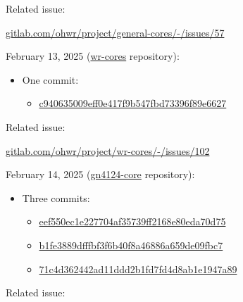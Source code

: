\noindent Related issue:

\vspace{5mm}

\href{https://gitlab.com/ohwr/project/general-cores/-/issues/57}{gitlab.com/ohwr/project/general-cores/-/issues/57}

\vspace{5mm}

\noindent February 13, 2025 (\href{https://gitlab.com/ohwr/project/wr-cores/}{wr-cores} repository):

\begin{itemize}
\item One commit:
    \begin{itemize}
    \item \href{https://gitlab.com/ohwr/project/wr-cores/-/commit/c940635009eff0e417f9b547fbd73396f89e6627}{c940635009eff0e417f9b547fbd73396f89e6627}
    \end{itemize}
\end{itemize}

\noindent Related issue:

\vspace{5mm}

\href{https://gitlab.com/ohwr/project/wr-cores/-/issues/102}{gitlab.com/ohwr/project/wr-cores/-/issues/102}

\vspace{5mm}

\noindent February 14, 2025 (\href{https://gitlab.com/ohwr/project/gn4124-core/}{gn4124-core} repository):

\begin{itemize}
\item Three commits:
    \begin{itemize}
    \item \href{https://gitlab.com/ohwr/project/gn4124-core/-/commit/eef550ec1e227704af35739ff2168e80eda70d75}{eef550ec1e227704af35739ff2168e80eda70d75}
    \item \href{https://gitlab.com/ohwr/project/gn4124-core/-/commit/b1fe3889dfffbf3f6b40f8a46886a659de09fbc7}{b1fe3889dfffbf3f6b40f8a46886a659de09fbc7}
    \item \href{https://gitlab.com/ohwr/project/gn4124-core/-/commit/71c4d362442ad11ddd2b1fd7fd4d8ab1e1947a89}{71c4d362442ad11ddd2b1fd7fd4d8ab1e1947a89}
    \end{itemize}
\end{itemize}

\noindent Related issue:

\vspace{5mm}

